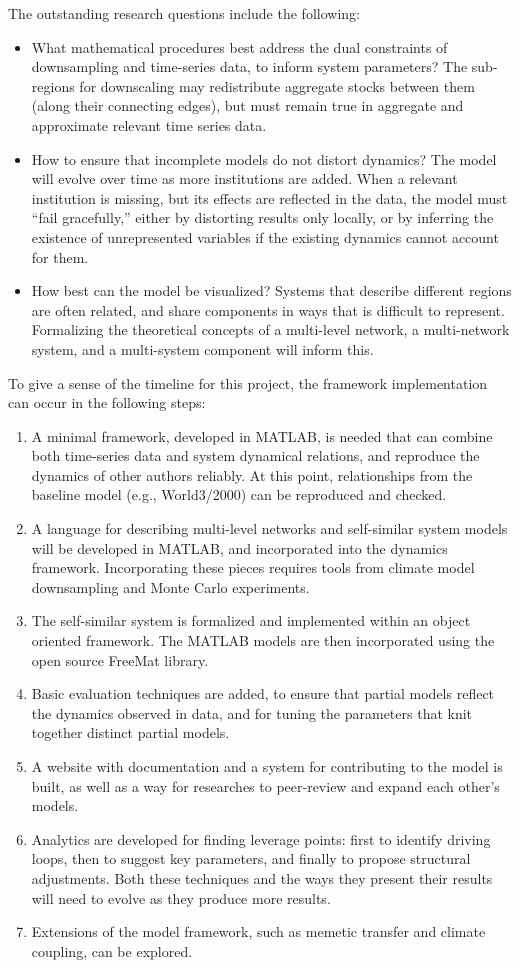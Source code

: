 \documentclass[12pt, oneside]{amsart}
\begin{document}
The outstanding research questions include the following:
\begin{itemize}
  \item What mathematical procedures best address the dual constraints of downsampling and time-series data, to inform system parameters?  The sub-regions for downscaling may redistribute aggregate stocks between them (along their connecting edges), but must remain true in aggregate and approximate relevant time series data.
  \item How to ensure that incomplete models do not distort dynamics?  The model will evolve over time as more institutions are added.  When a relevant institution is missing, but its effects are reflected in the data, the model must ``fail gracefully,'' either by distorting results only locally, or by inferring the existence of unrepresented variables if the existing dynamics cannot account for them.
  \item How best can the model be visualized?  Systems that describe different regions are often related, and share components in ways that is difficult to represent.  Formalizing the theoretical concepts of a multi-level network, a multi-network system, and a multi-system component will inform this.
\end{itemize}

To give a sense of the timeline for this project, the framework implementation can occur in the following steps:
\begin{enumerate}
  \item A minimal framework, developed in MATLAB, is needed that can combine both time-series data and system dynamical relations, and reproduce the dynamics of other authors reliably.  At this point, relationships from the baseline model (e.g., World3/2000) can be reproduced and checked.
  \item A language for describing multi-level networks and self-similar system models will be developed in MATLAB, and incorporated into the dynamics framework.  Incorporating these pieces requires tools from climate model downsampling and Monte Carlo experiments.
  \item The self-similar system is formalized and implemented within an object oriented framework.  The MATLAB models are then incorporated using the open source FreeMat library.
  \item Basic evaluation techniques are added, to ensure that partial models reflect the dynamics observed in data, and for tuning the parameters that knit together distinct partial models.
  \item A website with documentation and a system for contributing to the model is built, as well as a way for researches to peer-review and expand each other's models.
  \item Analytics are developed for finding leverage points: first to identify driving loops, then to suggest key parameters, and finally to propose structural adjustments.  Both these techniques and the ways they present their results will need to evolve as they produce more results.
  \item Extensions of the model framework, such as memetic transfer and climate coupling, can be explored.
\end{enumerate}
\end{document}
